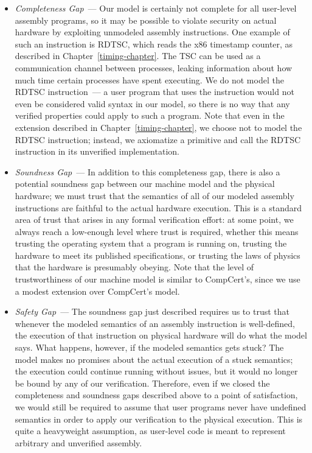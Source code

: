 \begin{itemize}
\item \emph{Completeness Gap}~--- Our model is certainly not complete for
all user-level assembly programs, so it may be possible to violate 
security on actual hardware by exploiting unmodeled assembly 
instructions. One example of such an instruction is RDTSC,
which reads the x86 timestamp counter, as described in 
Chapter~\ref{timing-chapter}. The TSC can be used as a communication
channel between processes, leaking information about how much
time certain processes have spent executing. We do not model the
RDTSC instruction~--- a user program that uses the instruction
would not even be considered valid syntax in our model, so there is
no way that any verified properties could apply to such a program.
Note that even in the extension described in Chapter~\ref{timing-chapter},
we choose not to model the RDTSC instruction; instead, we axiomatize
a  primitive and call the RDTSC instruction in its 
unverified implementation.

\item \emph{Soundness Gap}~--- In addition to this completeness gap, there is 
also a potential soundness 
gap between our machine model and the physical hardware; we must trust that 
the semantics of all of our modeled assembly instructions are faithful to
the actual hardware execution. This is a standard area of trust that arises
in any formal verification effort: at some point, we always reach a low-enough 
level where trust is required, whether this means trusting the operating system that 
a program is running on, trusting the hardware to meet its published specifications, 
or trusting the laws of physics that the hardware is presumably obeying. Note
that the level of trustworthiness of our machine model is similar to CompCert's, 
since we use a modest extension over CompCert's model.

\item \emph{Safety Gap}~--- The soundness gap just described requires us 
to trust that whenever the
modeled semantics of an assembly instruction is well-defined, the execution
of that instruction on physical hardware will do what the model says. What
happens, however, if the modeled semantics gets stuck? The model makes
no promises about the actual execution of a stuck semantics; the 
execution could continue running without issues, but it would no longer
be bound by any of our verification. Therefore, even if we closed the 
completeness and soundness gaps described above to a point of satisfaction, 
we would still be required to assume that user programs never have undefined 
semantics in order to apply our verification to the physical execution.
This is quite a heavyweight assumption, as user-level code is meant to 
represent arbitrary and unverified assembly.
\end{itemize}

